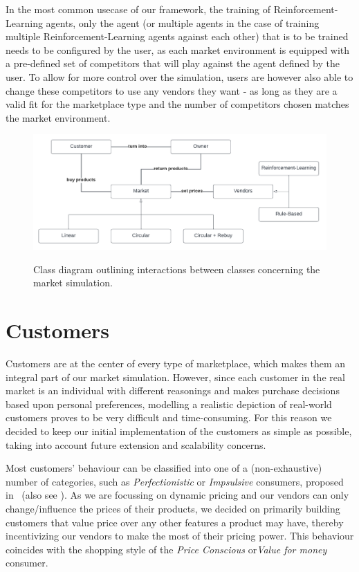 In the most common usecase of our framework, the training of Reinforcement-Learning agents, only the agent (or multiple agents in the case of training multiple Reinforcement-Learning agents against each other) that is to be trained needs to be configured by the user, as each market environment is equipped with a pre-defined set of competitors that will play against the agent defined by the user. To allow for more control over the simulation, users are however also able to change these competitors to use any vendors they want - as long as they are a valid fit for the marketplace type and the number of competitors chosen matches the market environment.

\begin{figure}[t]
	\centering
	\includegraphics[width = \textwidth]{images/overview_diagram.pdf}\\
	\caption{Class diagram outlining interactions between classes concerning the market simulation.}\label{fig:OverviewDiagram}
\end{figure}

\section{Customers}\label{sec:Customers}

Customers are at the center of every type of marketplace, which makes them an integral part of our market simulation. However, since each customer in the real market is an individual with different reasonings and makes purchase decisions based upon personal preferences, modelling a realistic depiction of real-world customers proves to be very difficult and time-consuming. For this reason we decided to keep our initial implementation of the customers as simple as possible, taking into account future extension and scalability concerns.

Most customers' behaviour can be classified into one of a (non-exhaustive) number of categories, such as \emph{Perfectionistic} or \emph{Impsulsive} consumers, proposed in~\cite{ShoppingStyles} (also see ). As we are focussing on dynamic pricing and our vendors can only change/influence the prices of their products, we decided on primarily building customers that value price over any other features a product may have, thereby incentivizing our vendors to make the most of their pricing power. This behaviour coincides with the shopping style of the \emph{Price Conscious} or\emph{Value for money} consumer.

